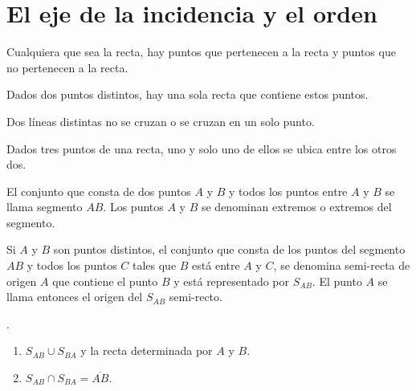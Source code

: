 \chapter{El eje de la incidencia y el orden}

\begin{axioma}
    Cualquiera que sea la recta, hay puntos que pertenecen a la recta y puntos que no pertenecen a la recta.\\
\end{axioma}

\begin{axioma}
    Dados dos puntos distintos, hay una sola recta que contiene estos puntos.\\
\end{axioma}

	\begin{proposicion}
	    Dos líneas distintas no se cruzan o se cruzan en un solo punto.\\
	\end{proposicion}

\setcounter{part}{2}
\begin{axioma}
   Dados tres puntos de una recta, uno y solo uno de ellos se ubica entre los otros dos.\\
\end{axioma}

    \begin{def.}
	El conjunto que consta de dos puntos $A$ y $B$ y todos los puntos entre $A$ y $B$ se llama segmento $AB$. Los puntos $A$ y $B$ se denominan extremos o extremos del segmento.\\
    \end{def.}

    \begin{def.}
	Si $A$ y $B$ son puntos distintos, el conjunto que consta de los puntos del segmento $AB$ y todos los puntos $C$ tales que $B$ está entre $A$ y $C$, se denomina semi-recta de origen $A$ que contiene el punto $B$ y está representado por $S_{AB}$. El punto $A$ se llama entonces el origen del $S_{AB}$ semi-recto.\\
    \end{def.}

	\begin{proposicion}.\\
	    \begin{enumerate}[\bfseries a)] 
		\item $S_{AB} \cup S_{BA}$ y la recta determinada por $A$ y $B$.
		\item $S_{AB} \cap S_{BA} = \overline{AB}$.\\
	    \end{enumerate}
	\end{proposicion}

